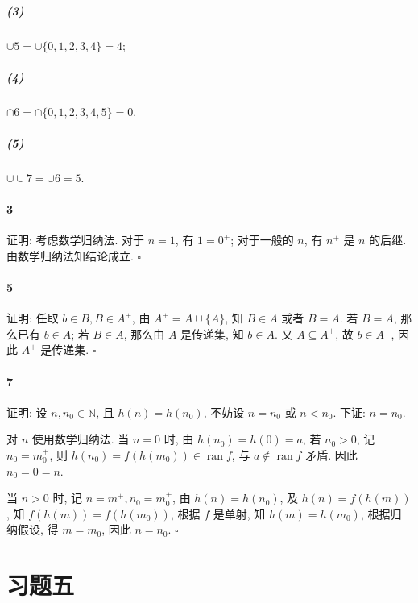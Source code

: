 \documentclass{ctexart}
\def\QED{\hfill $\square$}
\DeclareMathOperator{\ran}{ran}
\begin{document}
\subparagraph*{(3)} $\cup 5=\cup \{0,1,2,3,4\}=4$;

\subparagraph*{(4)} $\cap 6=\cap \{0,1,2,3,4,5\}=0$.

\subparagraph*{(5)} $\cup\cup 7=\cup 6=5$.

\paragraph*{3} 证明: 考虑数学归纳法. 对于 $n=1$, 有 $1=0^+$;
对于一般的 $n$, 有 $n^+$ 是 $n$ 的后继. 由数学归纳法知结论成立. \QED

\paragraph*{5} 证明: 任取 $b\in B, B\in A^+$, 由 $A^+=A\cup \{A\}$,
知 $B\in A$ 或者 $B=A$. 若 $B=A$, 那么已有 $b\in A$;
若 $B\in A$, 那么由 $A$ 是传递集, 知 $b\in A$.
又 $A\subseteq A^+$, 故 $b\in A^+$, 因此 $A^+$ 是传递集. \QED

\paragraph*{7} 证明: 设 $n, n_0 \in \mathbb{N}$, 且 $h(n)=h(n_0)$, 
不妨设 $n=n_0$ 或 $n< n_0$. 下证: $n=n_0$.

对 $n$ 使用数学归纳法.
当 $n=0$ 时, 由 $h(n_0)=h(0)=a$, 若 $n_0>0$, 记 $n_0=m_0^+$, 
则 $h(n_0)=f(h(m_0))\in \ran f$, 与 $a\notin \ran f$ 矛盾. 
因此 $n_0=0=n$.

当 $n>0$ 时, 记 $n=m^+, n_0=m_0^+$, 由 $h(n)=h(n_0)$, 
及 $h(n)=f(h(m))$, 知 $f(h(m))=f(h(m_0))$, 
根据 $f$ 是单射, 知 $h(m)=h(m_0)$, 根据归纳假设, 得 $m=m_0$,
因此 $n=n_0$. \QED

\section*{习题五}



\end{document}
